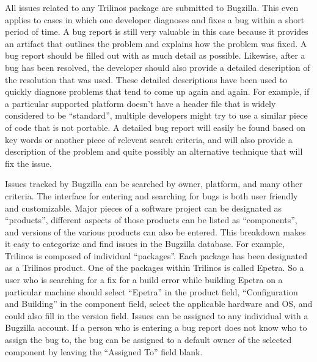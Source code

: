 \documentclass[12pt,relax]{article}
\begin{document}
All issues related to any Trilinos package are submitted to Bugzilla.  This 
even applies to cases in which 
one developer diagnoses and fixes a bug within a short period of time.  A bug 
report is still very valuable in this case because it provides an artifact 
that outlines the problem and explains how the problem was fixed.  A bug 
report should be filled out with as much detail as possible.  Likewise, after 
a bug has been resolved, the developer should also provide a detailed 
description of the resolution that was used.  These detailed descriptions have 
been used to quickly diagnose problems that tend to come up again and again.
For example, if a particular supported platform doesn't have a header file 
that is widely considered to be ``standard'', multiple developers might try 
to use a similar piece of code that is not portable.  A detailed bug report 
will easily be found based on key words or another piece of relevent search 
criteria, and will also provide a description of the problem and quite 
possibly an alternative technique that will fix the issue. 

Issues tracked by Bugzilla can be searched by owner, platform, and many other 
criteria.  The 
interface for entering and searching for bugs is both user friendly and 
customizable.  Major pieces of a software project can be 
designated as ``products'', different aspects of those products can be 
listed as ``components'', and versions of the various products can also be 
entered.  This breakdown makes it easy to categorize and find issues in the 
Bugzilla database.  For example, Trilinos is composed of individual 
``packages''.  Each package has been designated as a Trilinos product.  One of 
the packages within Trilinos is called Epetra.  So a user who is searching for 
a fix for a build error while building Epetra on a particular 
machine should select ``Epetra'' in the product field, ``Configuration and 
Building'' in the component field, select the applicable hardware and OS, and
could also fill in the version field.  Issues can be assigned to any 
individual with a Bugzilla account.  If a 
person who is entering a bug report does not know who to assign the bug to,
the bug can be assigned to a default owner of the selected component 
by leaving the ``Assigned To'' field blank.  
\end{document}
